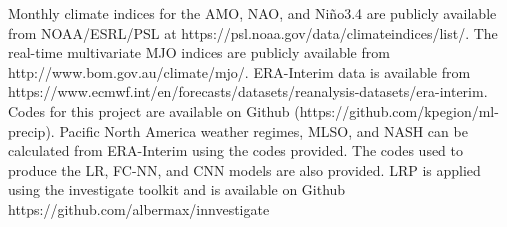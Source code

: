 \documentclass{ametsocV6.1}
\begin{document}
% 
%
\datastatement
Monthly climate indices for the AMO, NAO, and Ni\~{n}o3.4 are publicly available from NOAA/ESRL/PSL at https://psl.noaa.gov/data/climateindices/list/.
The real-time multivariate MJO indices are publicly available from http://www.bom.gov.au/climate/mjo/.
ERA-Interim data is available from https://www.ecmwf.int/en/forecasts/datasets/reanalysis-datasets/era-interim. Codes for this project are available on Github (https://github.com/kpegion/ml-precip).  Pacific North America weather regimes, MLSO, and NASH can be calculated from ERA-Interim using the codes provided. The codes used to produce the LR, FC-NN, and CNN models are also provided. LRP is applied using the investigate toolkit and is available on Github https://github.com/albermax/innvestigate
%






%
\end{document}
